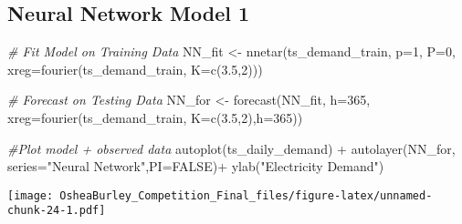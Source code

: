 \documentclass[
]{article}
\newenvironment{Shaded}{\begin{snugshade}}{\end{snugshade}}
\newcommand{\AttributeTok}[1]{\textcolor[rgb]{0.77,0.63,0.00}{#1}}
\newcommand{\CommentTok}[1]{\textcolor[rgb]{0.56,0.35,0.01}{\textit{#1}}}
\newcommand{\ConstantTok}[1]{\textcolor[rgb]{0.00,0.00,0.00}{#1}}
\newcommand{\DecValTok}[1]{\textcolor[rgb]{0.00,0.00,0.81}{#1}}
\newcommand{\FloatTok}[1]{\textcolor[rgb]{0.00,0.00,0.81}{#1}}
\newcommand{\FunctionTok}[1]{\textcolor[rgb]{0.00,0.00,0.00}{#1}}
\newcommand{\NormalTok}[1]{#1}
\newcommand{\OtherTok}[1]{\textcolor[rgb]{0.56,0.35,0.01}{#1}}
\newcommand{\SpecialCharTok}[1]{\textcolor[rgb]{0.00,0.00,0.00}{#1}}
\newcommand{\StringTok}[1]{\textcolor[rgb]{0.31,0.60,0.02}{#1}}
\begin{document}
\begin{Shaded}
\end{Shaded}

\hypertarget{neural-network-model-1}{%
\subsection{Neural Network Model 1}\label{neural-network-model-1}}

\begin{Shaded}
\begin{Highlighting}[]
\CommentTok{\# Fit Model on Training Data}
\NormalTok{NN\_fit }\OtherTok{\textless{}{-}} \FunctionTok{nnetar}\NormalTok{(ts\_demand\_train,}
                 \AttributeTok{p=}\DecValTok{1}\NormalTok{,}
                 \AttributeTok{P=}\DecValTok{0}\NormalTok{,}
                 \AttributeTok{xreg=}\FunctionTok{fourier}\NormalTok{(ts\_demand\_train, }\AttributeTok{K=}\FunctionTok{c}\NormalTok{(}\FloatTok{3.5}\NormalTok{,}\DecValTok{2}\NormalTok{)))}

\CommentTok{\# Forecast on Testing Data}
\NormalTok{NN\_for }\OtherTok{\textless{}{-}} \FunctionTok{forecast}\NormalTok{(NN\_fit, }
                   \AttributeTok{h=}\DecValTok{365}\NormalTok{,}
                   \AttributeTok{xreg=}\FunctionTok{fourier}\NormalTok{(ts\_demand\_train, }
                                          \AttributeTok{K=}\FunctionTok{c}\NormalTok{(}\FloatTok{3.5}\NormalTok{,}\DecValTok{2}\NormalTok{),}\AttributeTok{h=}\DecValTok{365}\NormalTok{))}

\CommentTok{\#Plot model + observed data}
\FunctionTok{autoplot}\NormalTok{(ts\_daily\_demand) }\SpecialCharTok{+}
  \FunctionTok{autolayer}\NormalTok{(NN\_for, }\AttributeTok{series=}\StringTok{"Neural Network"}\NormalTok{,}\AttributeTok{PI=}\ConstantTok{FALSE}\NormalTok{)}\SpecialCharTok{+}
  \FunctionTok{ylab}\NormalTok{(}\StringTok{"Electricity Demand"}\NormalTok{) }
\end{Highlighting}
\end{Shaded}

\texttt{[image: OsheaBurley\_Competition\_Final\_files/figure-latex/unnamed-chunk-24-1.pdf]}
\end{document}

